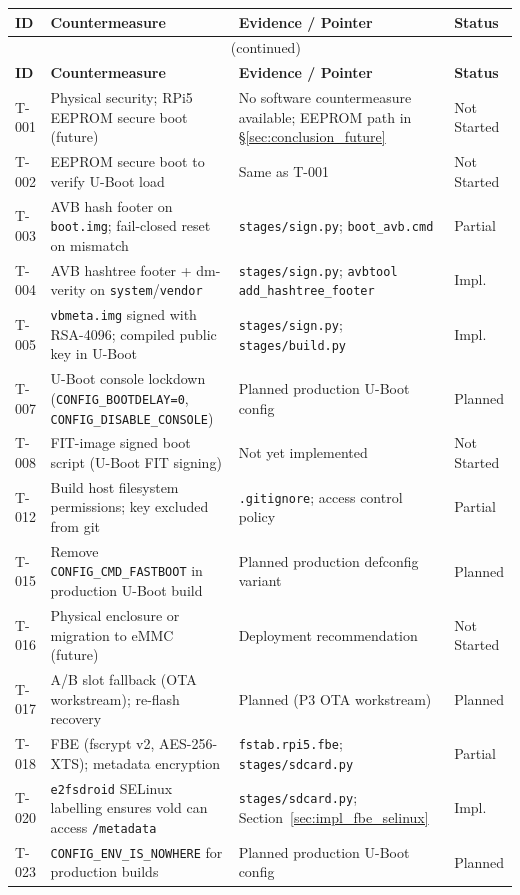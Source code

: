 \begin{tabularx}{\textwidth}{p{0.8cm} p{4.5cm} X p{1.5cm}}
\caption{Mitigation mapping for Critical and High risks}
\label{tab:mitigations} \\
\toprule
\textbf{ID} & \textbf{Countermeasure} & \textbf{Evidence / Pointer} & \textbf{Status} \\
\midrule
\endfirsthead
\multicolumn{4}{c}{\tablename\ \thetable{} (continued)} \\
\toprule
\textbf{ID} & \textbf{Countermeasure} & \textbf{Evidence / Pointer} & \textbf{Status} \\
\midrule
\endhead
\bottomrule
\endfoot
T-001 & Physical security; RPi5 EEPROM secure boot (future) & No software countermeasure available; EEPROM path in \S\ref{sec:conclusion_future} & Not Started \\
T-002 & EEPROM secure boot to verify U-Boot load & Same as T-001 & Not Started \\
T-003 & AVB hash footer on \texttt{boot.img}; fail-closed reset on mismatch & \texttt{stages/sign.py}; \texttt{boot\_avb.cmd} & Partial \\
T-004 & AVB hashtree footer + dm-verity on \texttt{system}/\texttt{vendor} & \texttt{stages/sign.py}; \texttt{avbtool add\_hashtree\_footer} & Impl. \\
T-005 & \texttt{vbmeta.img} signed with RSA-4096; compiled public key in U-Boot & \texttt{stages/sign.py}; \texttt{stages/build.py} & Impl. \\
T-007 & U-Boot console lockdown (\texttt{CONFIG\_BOOTDELAY=0}, \texttt{CONFIG\_DISABLE\_CONSOLE}) & Planned production U-Boot config & Planned \\
T-008 & FIT-image signed boot script (U-Boot FIT signing) & Not yet implemented & Not Started \\
T-012 & Build host filesystem permissions; key excluded from git & \texttt{.gitignore}; access control policy & Partial \\
T-015 & Remove \texttt{CONFIG\_CMD\_FASTBOOT} in production U-Boot build & Planned production defconfig variant & Planned \\
T-016 & Physical enclosure or migration to eMMC (future) & Deployment recommendation & Not Started \\
T-017 & A/B slot fallback (OTA workstream); re-flash recovery & Planned (P3 OTA workstream) & Planned \\
T-018 & FBE (fscrypt v2, AES-256-XTS); metadata encryption & \texttt{fstab.rpi5.fbe}; \texttt{stages/sdcard.py} & Partial \\
T-020 & \texttt{e2fsdroid} SELinux labelling ensures vold can access \texttt{/metadata} & \texttt{stages/sdcard.py}; Section~\ref{sec:impl_fbe_selinux} & Impl. \\
T-023 & \texttt{CONFIG\_ENV\_IS\_NOWHERE} for production builds & Planned production U-Boot config & Planned \\
\end{tabularx}

